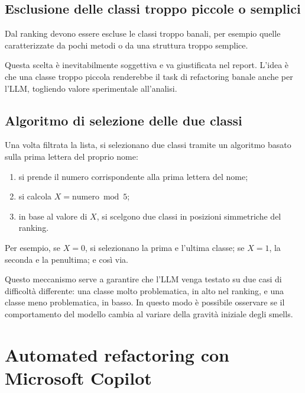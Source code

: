 \subsection{Esclusione delle classi troppo piccole o semplici}

Dal ranking devono essere escluse le classi troppo banali, per esempio quelle caratterizzate da pochi metodi o da una struttura troppo semplice.

\begin{notaprof}
Questa scelta è inevitabilmente soggettiva e va giustificata nel report. L'idea è che una classe troppo piccola renderebbe il task di refactoring banale anche per l'LLM, togliendo valore sperimentale all'analisi.
\end{notaprof}

\subsection{Algoritmo di selezione delle due classi}

Una volta filtrata la lista, si selezionano due classi tramite un algoritmo basato sulla prima lettera del proprio nome:

\begin{enumerate}
    \item si prende il numero corrispondente alla prima lettera del nome;
    \item si calcola \(X = \text{numero} \bmod 5\);
    \item in base al valore di \(X\), si scelgono due classi in posizioni simmetriche del ranking.
\end{enumerate}

Per esempio, se \(X = 0\), si selezionano la prima e l'ultima classe; se \(X = 1\), la seconda e la penultima; e così via.

\begin{notaprof}
Questo meccanismo serve a garantire che l'LLM venga testato su due casi di difficoltà differente: una classe molto problematica, in alto nel ranking, e una classe meno problematica, in basso. In questo modo è possibile osservare se il comportamento del modello cambia al variare della gravità iniziale degli smells.
\end{notaprof}

\section{Automated refactoring con Microsoft Copilot}

